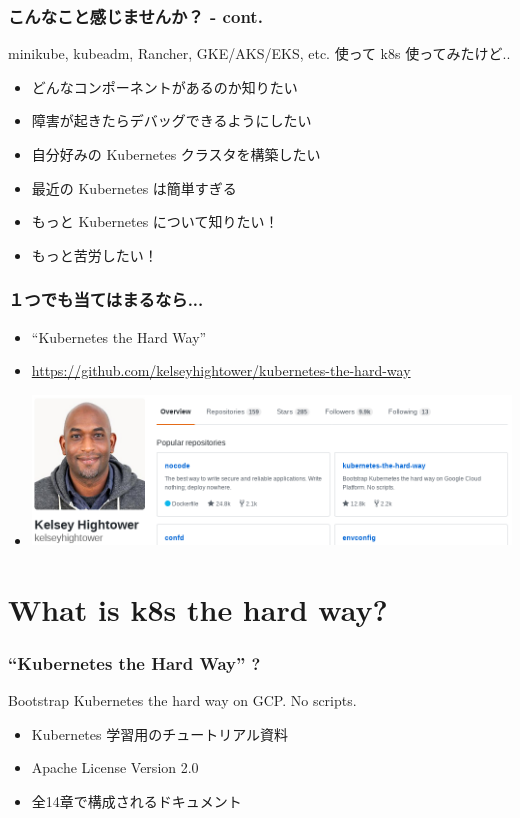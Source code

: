 \documentclass[aspectratio=169,11pt,hyperref={colorlinks=true}]{beamer}
\begin{document}
\begin{frame}
  \frametitle{こんなこと感じませんか？ - cont.}
  minikube, kubeadm, Rancher, GKE/AKS/EKS, etc. 使って k8s 使ってみたけど..
  \begin{itemize}
    \item どんなコンポーネントがあるのか知りたい
    \item 障害が起きたらデバッグできるようにしたい
    \item 自分好みの Kubernetes クラスタを構築したい
    \item 最近の Kubernetes は簡単すぎる
    \item もっと Kubernetes について知りたい！
    \item もっと苦労したい！
  \end{itemize}
\end{frame}

\begin{frame}
  \frametitle{１つでも当てはまるなら...}
  \begin{itemize}
    \item[] \Huge{``Kubernetes the Hard Way''}\large{}
    \item \url{https://github.com/kelseyhightower/kubernetes-the-hard-way}
    \item[] \includegraphics[height=40mm]{images/kelseyhightower_overview.png}
  \end{itemize}
\end{frame}

\section{What is k8s the hard way?}
\begin{frame}
  \frametitle{``Kubernetes the Hard Way'' ?}
  Bootstrap Kubernetes the hard way on GCP. No scripts.
  \begin{itemize}
    \item Kubernetes 学習用のチュートリアル資料
    \item Apache License Version 2.0
    \item 全14章で構成されるドキュメント
  \end{itemize}
\end{frame}
\end{document}
